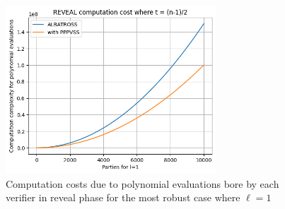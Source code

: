 \begin{figure}[H]
  \centering
  \includegraphics[width=0.7\textwidth]{figures/polynomial.png}
  \caption{Computation costs due to polynomial evaluations bore by each verifier in 
  reveal phase for the most robust case where $\ell=1$}
  \label{fig:commit_polynomial}
\end{figure}